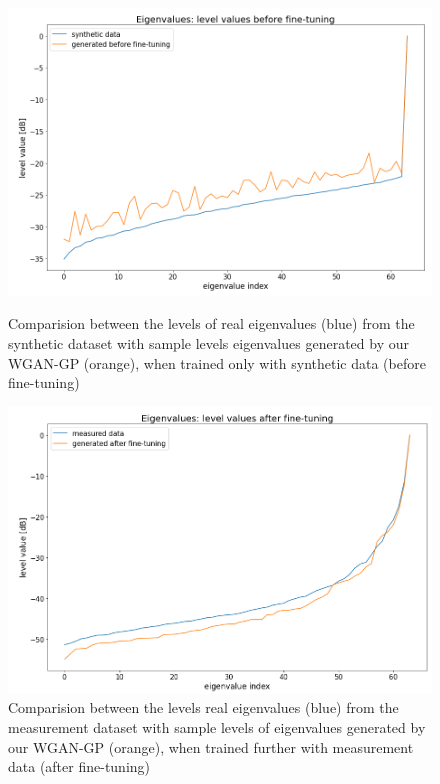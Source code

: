 \documentclass{article}
\begin{document}
\begin{figure}
    \centering
    \begin{minipage}{0.45\textwidth}
        \includegraphics[width=1.2\textwidth]{../figs/evals_dB_sample_before_finetuning.png}
        \caption{Comparision between the levels of real eigenvalues (blue) from the synthetic dataset with sample levels eigenvalues generated by our WGAN-GP (orange), when trained only with synthetic data (before fine-tuning)}
        \label{fig:evals_dB_sample_before_finetuning}
    \end{minipage}\hfill
    \begin{minipage}{0.45\textwidth}
        \includegraphics[width=1.2\textwidth]{../figs/evals_dB_sample_after_finetuning.png}
        \caption{Comparision between the levels real eigenvalues (blue) from the measurement dataset with sample levels of eigenvalues generated by our WGAN-GP (orange), when trained further with measurement data (after fine-tuning)}
        \label{fig:evals_dB_sample_after_finetuning}
    \end{minipage}
\end{figure}
\end{document}
